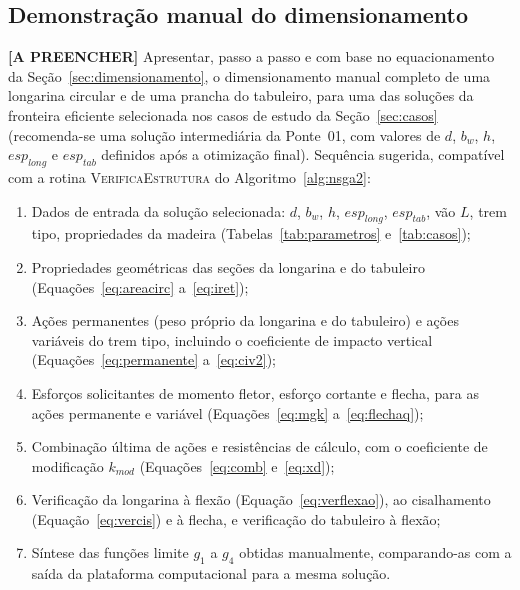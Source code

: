 \begin{appendices}

\section{Demonstração manual do dimensionamento}\label{ap:demonstracao}

\begin{fillblock}
\noindent\textbf{[A PREENCHER]} Apresentar, passo a passo e com base no equacionamento da Seção~\ref{sec:dimensionamento}, o dimensionamento manual completo de uma longarina circular e de uma prancha do tabuleiro, para uma das soluções da fronteira eficiente selecionada nos casos de estudo da Seção~\ref{sec:casos} (recomenda-se uma solução intermediária da Ponte~01, com valores de $d$, $b_w$, $h$, $esp_{long}$ e $esp_{tab}$ definidos após a otimização final). Sequência sugerida, compatível com a rotina \textsc{VerificaEstrutura} do Algoritmo~\ref{alg:nsga2}:

\begin{enumerate}
    \item Dados de entrada da solução selecionada: $d$, $b_w$, $h$, $esp_{long}$, $esp_{tab}$, vão $L$, trem tipo, propriedades da madeira (Tabelas~\ref{tab:parametros} e~\ref{tab:casos});
    \item Propriedades geométricas das seções da longarina e do tabuleiro (Equações~\eqref{eq:areacirc} a~\eqref{eq:iret});
    \item Ações permanentes (peso próprio da longarina e do tabuleiro) e ações variáveis do trem tipo, incluindo o coeficiente de impacto vertical (Equações~\eqref{eq:permanente} a~\eqref{eq:civ2});
    \item Esforços solicitantes de momento fletor, esforço cortante e flecha, para as ações permanente e variável (Equações~\eqref{eq:mgk} a~\eqref{eq:flechaq});
    \item Combinação última de ações e resistências de cálculo, com o coeficiente de modificação $k_{mod}$ (Equações~\eqref{eq:comb} e~\eqref{eq:xd});
    \item Verificação da longarina à flexão (Equação~\eqref{eq:verflexao}), ao cisalhamento (Equação~\eqref{eq:vercis}) e à flecha, e verificação do tabuleiro à flexão;
    \item Síntese das funções limite $g_1$ a $g_4$ obtidas manualmente, comparando-as com a saída da plataforma computacional para a mesma solução.
\end{enumerate}
\end{fillblock}


\end{appendices}
